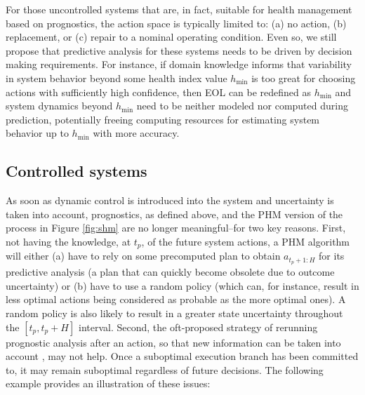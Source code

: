 For those uncontrolled systems that are, in fact, suitable for health management based on prognostics, the action space is typically limited to: (a) no action, (b) replacement, or (c) repair to a nominal operating condition. Even so, we still propose that predictive analysis for these systems needs to be driven by decision making requirements. For instance, if domain knowledge informs that variability in system behavior beyond some health index value $h_\text{min}$ is too great for choosing actions with sufficiently high confidence, then EOL can be redefined as $h_\text{min}$ and system dynamics beyond $h_\text{min}$ need to be neither modeled nor computed during prediction, potentially freeing computing resources for estimating system behavior up to $h_\text{min}$ with more accuracy.

\subsection{Controlled systems}

As soon as dynamic control is introduced into the system and uncertainty is taken into account, prognostics, as defined above, and the PHM version of the process in Figure \ref{fig:shm} are no longer meaningful--for two key reasons. First, not having the knowledge, at $t_p$, of the future system actions, a PHM algorithm will either (a) have to rely on some precomputed plan to obtain $a_{t_p+1:H}$ for its predictive analysis (a plan that can quickly become obsolete due to outcome uncertainty) or (b) have to use a random policy (which can, for instance, result in less optimal actions being considered as probable as the more optimal ones). A random policy is also likely to result in a greater state uncertainty throughout the $[t_p,t_p+H]$ interval. Second, the oft-proposed strategy of rerunning prognostic analysis after an action, so that new information can be taken into account \cite{Tang2011}, may not help. Once a suboptimal execution branch has been committed to, it may remain suboptimal regardless of future decisions. The following example provides an illustration of these issues:

